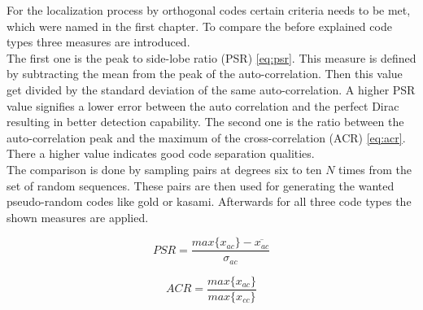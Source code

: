 For the localization process by orthogonal codes certain criteria needs to be met, which were named in the first chapter. To compare the before explained code types three measures are introduced. \\ 
The first one is the peak to side-lobe ratio (PSR) \ref{eq:psr}. This measure is defined by subtracting the mean from the peak of the auto-correlation. Then this value get divided by the standard deviation of the same auto-correlation. A higher PSR value signifies a lower error between the auto correlation and the perfect Dirac resulting in better detection capability. The second one is the ratio between the auto-correlation peak and the maximum of the cross-correlation (ACR) \ref{eq:acr}. There a higher value indicates good code separation qualities.\\
The comparison is done by sampling pairs at degrees six to ten $N$ times from the set of random sequences. These pairs are then used for generating the wanted pseudo-random codes like gold or kasami. Afterwards for all three code types the shown measures are applied.  


\begin{equation}
PSR=\dfrac{max\{x_{ac}\}-\overline{x_{ac}}}{\sigma_{ac}}
\label{eq:psr}
\end{equation}

\begin{equation}
ACR=\dfrac{max\{x_{ac}\}}{max\{{x_{cc}\}}}
\label{eq:acr}
\end{equation}

